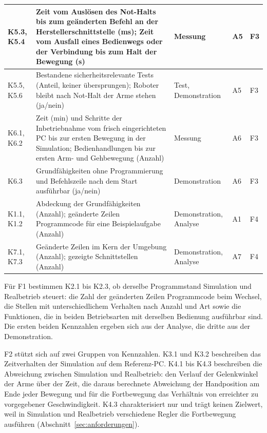 \begin{table}[htbp]
\begin{tabularx}{\textwidth}{|P{1.9cm}|L|P{2.8cm}|P{2.6cm}|P{1.2cm}|}
        K5.3, K5.4 & Zeit vom Auslösen des Not-Halts bis zum geänderten Befehl an der Herstellerschnittstelle (ms); Zeit vom Ausfall eines Bedienwegs oder der Verbindung bis zum Halt der Bewegung (s) & Messung & A5 & F3\\\hline
        K5.5, K5.6 & Bestandene sicherheitsrelevante Tests (Anteil, keiner übersprungen); Roboter bleibt nach Not-Halt der Arme stehen (ja/nein) & Test, Demonstration & A5 & F3\\\hline
        K6.1, K6.2 & Zeit (min) und Schritte der Inbetriebnahme vom frisch eingerichteten PC bis zur ersten Bewegung in der Simulation; Bedienhandlungen bis zur ersten Arm- und Gehbewegung (Anzahl) & Messung & A6 & F3\\\hline
        K6.3 & Grundfähigkeiten ohne Programmierung und Befehlszeile nach dem Start ausführbar (ja/nein) & Demonstration & A6 & F3\\\hline
        K1.1, K1.2 & Abdeckung der Grundfähigkeiten (Anzahl); geänderte Zeilen Programmcode für eine Beispielaufgabe (Anzahl) & Demonstration, Analyse & A1 & F4\\\hline
        K7.1, K7.3 & Geänderte Zeilen im Kern der Umgebung (Anzahl); gezeigte Schnittstellen (Anzahl) & Demonstration, Analyse & A7 & F4\\\hline
    \end{tabularx}
\end{table}

Für F1 bestimmen K2.1 bis K2.3, ob derselbe Programmstand Simulation und Realbetrieb steuert: die Zahl der geänderten Zeilen Programmcode beim Wechsel, die Stellen mit unterschiedlichem Verhalten nach Anzahl und Art sowie die Funktionen, die in beiden Betriebsarten mit derselben Bedienung ausführbar sind.
Die ersten beiden Kennzahlen ergeben sich aus der Analyse, die dritte aus der Demonstration.

F2 stützt sich auf zwei Gruppen von Kennzahlen.
K3.1 und K3.2 beschreiben das Zeitverhalten der Simulation auf dem Referenz-PC.
K4.1 bis K4.3 beschreiben die Abweichung zwischen Simulation und Realbetrieb: den Verlauf der Gelenkwinkel der Arme über der Zeit, die daraus berechnete Abweichung der Handposition am Ende jeder Bewegung und für die Fortbewegung das Verhältnis von erreichter zu vorgegebener Geschwindigkeit.
K4.3 charakterisiert nur und trägt keinen Zielwert, weil in Simulation und Realbetrieb verschiedene Regler die Fortbewegung ausführen (Abschnitt~\ref{sec:anforderungen}).

